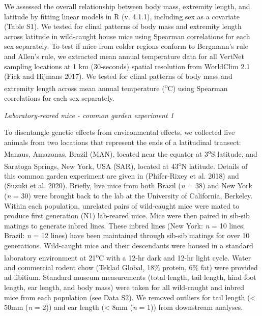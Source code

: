 \documentclass[
]{article}
\begin{document}
We assessed the overall relationship between body mass, extremity
length, and latitude by fitting linear models in R (v. 4.1.1), including
sex as a covariate (Table S1). We tested for clinal patterns of body
mass and extremity length across latitude in wild-caught house mice
using Spearman correlations for each sex separately. To test if mice
from colder regions conform to Bergmann's rule and Allen's rule, we
extracted mean annual temperature data for all VertNet sampling
locations at 1 km (30-seconds) spatial resolution from WorldClim 2.1
(Fick and Hijmans 2017). We tested for clinal patterns of body mass and
extremity length across mean annual temperature (\textsuperscript{o}C)
using Spearman correlations for each sex separately.

\vspace{3.5mm}

\noindent\emph{Laboratory-reared mice - common garden experiment 1}

To disentangle genetic effects from environmental effects, we collected
live animals from two locations that represent the ends of a latitudinal
transect: Manaus, Amazonas, Brazil (MAN), located near the equator at
3\textsuperscript{o}S latitude, and Saratoga Springs, New York, USA
(SAR), located at 43\textsuperscript{o}N latitude. Details of this
common garden experiment are given in (Phifer-Rixey et al. 2018) and
(Suzuki et al. 2020). Briefly, live mice from both Brazil (\emph{n} =
38) and New York (\emph{n} = 30) were brought back to the lab at the
University of California, Berkeley. Within each population, unrelated
pairs of wild-caught mice were mated to produce first generation (N1)
lab-reared mice. Mice were then paired in sib-sib matings to generate
inbred lines. These inbred lines (New York: \emph{n} = 10 lines; Brazil:
\emph{n} = 12 lines) have been maintained through sib-sib matings for
over 10 generations. Wild-caught mice and their descendants were housed
in a standard laboratory environment at 21\textsuperscript{o}C with a
12-hr dark and 12-hr light cycle. Water and commercial rodent chow
(Teklad Global, 18\% protein, 6\% fat) were provided ad libitium.
Standard museum measurements (total length, tail length, hind foot
length, ear length, and body mass) were taken for all wild-caught and
inbred mice from each population (see Data S2). We removed outliers for
tail length (\textless{} 50mm (\emph{n} = 2)) and ear length
(\textless{} 8mm (\emph{n} = 1)) from downstream analyses.

\vspace{3.5mm}
\end{document}
